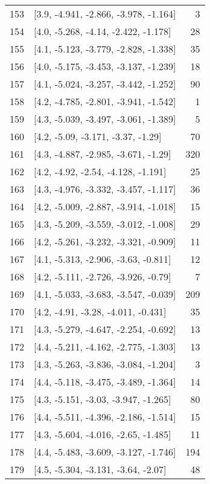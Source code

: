 \documentclass{article}%
\begin{document}
\begin{longtable}{llr}
153 &  [3.9, -4.941, -2.866, -3.978, -1.164] &       3 \\
154 &   [4.0, -5.268, -4.14, -2.422, -1.178] &      28 \\
155 &  [4.1, -5.123, -3.779, -2.828, -1.338] &      35 \\
156 &  [4.0, -5.175, -3.453, -3.137, -1.239] &      18 \\
157 &  [4.1, -5.024, -3.257, -3.442, -1.252] &      90 \\
158 &  [4.2, -4.785, -2.801, -3.941, -1.542] &       1 \\
159 &  [4.3, -5.039, -3.497, -3.061, -1.389] &       5 \\
160 &     [4.2, -5.09, -3.171, -3.37, -1.29] &      70 \\
161 &   [4.3, -4.887, -2.985, -3.671, -1.29] &     320 \\
162 &    [4.2, -4.92, -2.54, -4.128, -1.191] &      25 \\
163 &  [4.3, -4.976, -3.332, -3.457, -1.117] &      36 \\
164 &  [4.2, -5.009, -2.887, -3.914, -1.018] &      15 \\
165 &  [4.3, -5.209, -3.559, -3.012, -1.008] &      29 \\
166 &  [4.2, -5.261, -3.232, -3.321, -0.909] &      11 \\
167 &   [4.1, -5.313, -2.906, -3.63, -0.811] &      12 \\
168 &   [4.2, -5.111, -2.726, -3.926, -0.79] &       7 \\
169 &  [4.1, -5.033, -3.683, -3.547, -0.039] &     209 \\
170 &    [4.2, -4.91, -3.28, -4.011, -0.431] &      35 \\
171 &  [4.3, -5.279, -4.647, -2.254, -0.692] &      13 \\
172 &  [4.4, -5.211, -4.162, -2.775, -1.303] &      13 \\
173 &  [4.3, -5.263, -3.836, -3.084, -1.204] &       3 \\
174 &  [4.4, -5.118, -3.475, -3.489, -1.364] &      14 \\
175 &   [4.3, -5.151, -3.03, -3.947, -1.265] &      80 \\
176 &  [4.4, -5.511, -4.396, -2.186, -1.514] &      15 \\
177 &   [4.3, -5.604, -4.016, -2.65, -1.485] &      11 \\
178 &  [4.4, -5.483, -3.609, -3.127, -1.746] &     194 \\
179 &    [4.5, -5.304, -3.131, -3.64, -2.07] &      48 \\

\end{longtable}
\end{document}
